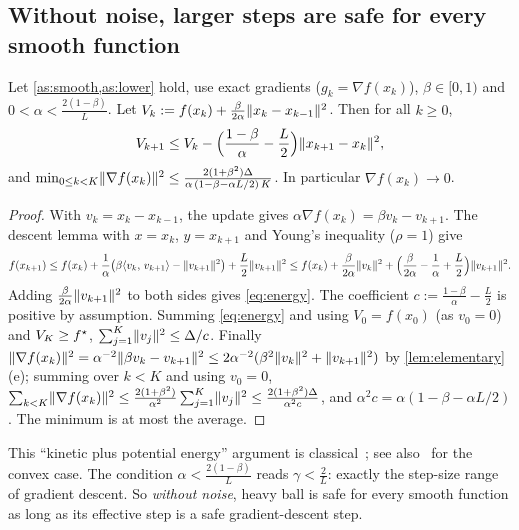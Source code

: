 \subsection{Without noise, larger steps are safe for every smooth function}

\begin{proposition}\label{prop:energy}
Let \cref{as:smooth,as:lower} hold, use exact gradients ($g_k=\nabla f(x_k)$),
$\beta\in[0,1)$ and $0<\alpha<\frac{2(1-\beta)}{L}$. Let
$V_k:=f(x_k)+\frac{\beta}{2\alpha}\lVert x_k-x_{k-1}\rVert^2$. Then for all $k\ge0$,
\begin{equation}\label{eq:energy}
  V_{k+1}\le V_k-\Bigl(\frac{1-\beta}{\alpha}-\frac L2\Bigr)\lVert x_{k+1}-x_k\rVert^2,
\end{equation}
and $\min_{0\le k<K}\lVert \nabla f(x_k)\rVert^2\le\frac{2(1+\beta^2)\Delta}{\alpha\,(1-\beta-\alpha L/2)\,K}$.
In particular $\nabla f(x_k)\to0$.
\end{proposition}

\begin{proof}
With $v_k=x_k-x_{k-1}$, the update gives $\alpha\nabla f(x_k)=\beta v_k-v_{k+1}$. The descent
lemma with $x=x_k$, $y=x_{k+1}$ and Young's inequality ($\rho=1$) give
\[
  f(x_{k+1})\le f(x_k)+\frac1\alpha\bigl(\beta\langle v_k,\, v_{k+1}\rangle-\lVert v_{k+1}\rVert^2\bigr)+\frac L2\lVert v_{k+1}\rVert^2
  \le f(x_k)+\frac\beta{2\alpha}\lVert v_k\rVert^2+\Bigl(\frac\beta{2\alpha}-\frac1\alpha+\frac L2\Bigr)\lVert v_{k+1}\rVert^2 .
\]
Adding $\frac{\beta}{2\alpha}\lVert v_{k+1}\rVert^2$ to both sides gives \eqref{eq:energy}. The
coefficient $c:=\frac{1-\beta}\alpha-\frac L2$ is positive by assumption. Summing
\eqref{eq:energy} and using $V_0=f(x_0)$ (as $v_0=0$) and $V_K\ge f^\star$,
$\sum_{j=1}^K\lVert v_j\rVert^2\le\Delta/c$. Finally
$\lVert \nabla f(x_k)\rVert^2=\alpha^{-2}\lVert \beta v_k-v_{k+1}\rVert^2\le2\alpha^{-2}(\beta^2\lVert v_k\rVert^2+\lVert v_{k+1}\rVert^2)$
by \cref{lem:elementary}(e); summing over $k<K$ and using $v_0=0$,
$\sum_{k<K}\lVert \nabla f(x_k)\rVert^2\le\frac{2(1+\beta^2)}{\alpha^2}\sum_{j=1}^K\lVert v_j\rVert^2
\le\frac{2(1+\beta^2)\Delta}{\alpha^2c}$, and $\alpha^2c=\alpha(1-\beta-\alpha L/2)$.
The minimum is at most the average.
\end{proof}

This ``kinetic plus potential energy'' argument is classical~\cite{zavriev1993}; see
also~\cite{ghadimi2015} for the convex case. The condition $\alpha<\frac{2(1-\beta)}L$ reads
$\gamma<\frac2L$: exactly the step-size range of gradient descent. So \emph{without noise},
heavy ball is safe for every smooth function as long as its effective step is a safe
gradient-descent step.

